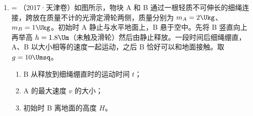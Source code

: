 \documentclass[\gkver]{gaokaozhenti}
\makeatletter
\newcommand{\tiinfo}[2]{{\small\color{gray}（#1）\textcolor{orange!85!black}{\nandu{#2}}}\hspace{0.4em}}
\newenvironment{tibody}
  {\begin{minipage}[t]{\linewidth}\@listdepth=\@ne\leavevmode\ignorespaces}
  {\end{minipage}}
\makeatother
\begin{document}
\begin{enumerate}[resume=tiku]
{	$v_{3}=0.2\Ums$

	然后乙做减速运动，当速度减为零时则

	$x=\frac{v_{3}^{2}}{2a}=\frac{0.2^{2}}{2\times1}\Um=0.02\Um=s_{2}$

	可知乙恰好能滑到边框 a；

	（2）甲与乙碰前运动的时间

	$t_{1}=\frac{v_{0}-v_{1}}{a}=\frac{0.4-0.3}{1}\Us=0.1\Us$

	碰后甲运动的时间

	$t_{2}=\frac{v_{2}}{a}=\frac{0.1}{1}\Us=0.1\Us$

	则甲运动的总时间为

	$t=t_{1}+t_{2}=0.2\Us$
}

\item
\begin{tibody}
\tiinfo{2017·天津卷}{2}如图所示，物块 A 和 B 通过一根轻质不可伸长的细绳连接，跨放在质量不计的光滑定滑轮两侧，质量分别为 $m_{A}=2 \Ukg$、$m_{B}=1 \Ukg$。初始时 A 静止与水平地面上，B 悬于空中。先将 B 竖直向上再举高 $h=1.8 \Um$（未触及滑轮）然后由静止释放。一段时间后细绳绷直，A、B 以大小相等的速度一起运动，之后 B 恰好可以和地面接触。取 $g=10 \Umsq$。

\begin{enumerate}
	\item
	B 从释放到细绳绷直时的运动时间 $t$；
	\item
	A 的最大速度 $v$ 的大小；
	\item
	初始时 B 离地面的高度 $H$。
\end{enumerate}
\onepicture[h=4.4cm, align=right]{}
\end{tibody}

\end{enumerate}
\end{document}
